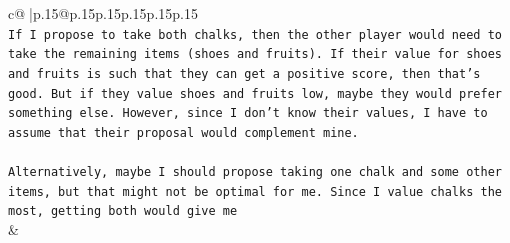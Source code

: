 \documentclass{article}
\begin{document}
{\begin{supertabular}{c@{$\;$}|p{.15\linewidth}@{}p{.15\linewidth}p{.15\linewidth}p{.15\linewidth}p{.15\linewidth}p{.15\linewidth}}
{{{\\ 
\texttt{If I propose to take both chalks, then the other player would need to take the remaining items (shoes and fruits). If their value for shoes and fruits is such that they can get a positive score, then that's good. But if they value shoes and fruits low, maybe they would prefer something else. However, since I don't know their values, I have to assume that their proposal would complement mine.} \\
\\ 
\texttt{Alternatively, maybe I should propose taking one chalk and some other items, but that might not be optimal for me. Since I value chalks the most, getting both would give me} \\
            }
        }
    }
    & \\ \\


\end{supertabular}}
\end{document}
